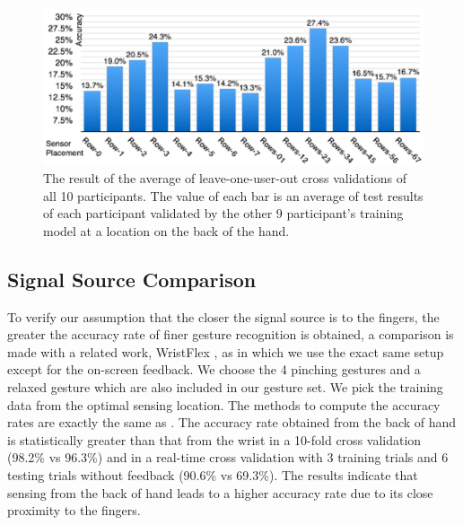 \documentclass{sigchi}
\begin{document}
\begin{figure}
 \begin{center}
  \includegraphics[width=1\columnwidth]{figures/LOO_V2.pdf}
  \caption{
    The result of the average of leave-one-user-out cross validations of all 10 participants.
    The value of each bar is an average of test results of each participant validated by the other 9 participant's training model at a location on the back of the hand.
  }
  \label{fig:LOO}
  \end{center}
\end{figure}

\subsection{Signal Source Comparison}
To verify our assumption that the closer the signal source is to the fingers, the greater the accuracy rate of finer gesture recognition is obtained, a comparison is made with a related work, WristFlex \cite{Dementyev:2014:WLG:2642918.2647396}, as in which we use the exact same setup except for the on-screen feedback.
We choose the 4 pinching gestures and a relaxed gesture \cite{Dementyev:2014:WLG:2642918.2647396} which are also included in our gesture set. We pick the training data from the optimal sensing location. The methods to compute the accuracy rates are exactly the same as \cite{Dementyev:2014:WLG:2642918.2647396}. The accuracy rate obtained from the back of hand is statistically greater than that from the wrist in a 10-fold cross validation (98.2\% vs 96.3\%) and in a real-time cross validation with 3 training trials and 6 testing trials without feedback (90.6\% vs 69.3\%). The results indicate that sensing from the back of hand leads to a higher accuracy rate due to its close proximity to the fingers.
\end{document}
